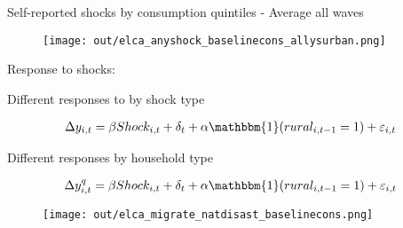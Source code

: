 \documentclass[aspectratio = 169]{beamer}
\begin{document}
\begin{frame}{Self-reported shocks by consumption quintiles - Average all waves}

	\begin{figure}
		\texttt{[image: out/elca\_anyshock\_baselinecons\_allysurban.png]}
   \end{figure}   

\end{frame}

\begin{frame}[c]{}        
	\centering
	\large Response to shocks:
\end{frame}
  
\begin{frame}{Different responses to by shock type}

	\begin{align*} 
	    \Delta y_{i, t} = \beta Shock_{i,t} + \delta_{t} + \alpha \mathbbm{1}(rural_{i,t-1}=1) + \varepsilon_{i,t}
	\end{align*}

 	\centering
 	\scalebox{0.8}{}
 	\medskip

\end{frame}

\begin{frame}{Different responses by household type}

	\vspace{-20pt}
	\begin{align*} 
	    \Delta y^{q}_{i, t} = \beta Shock_{i,t} + \delta_{t} + \alpha \mathbbm{1}(rural_{i,t-1}=1) + \varepsilon_{i,t}
	\end{align*}
	
	\vspace{-10pt}
   \begin{figure}
		\texttt{[image: out/elca\_migrate\_natdisast\_baselinecons.png]}
   \end{figure}   

\end{frame}
\end{document}
